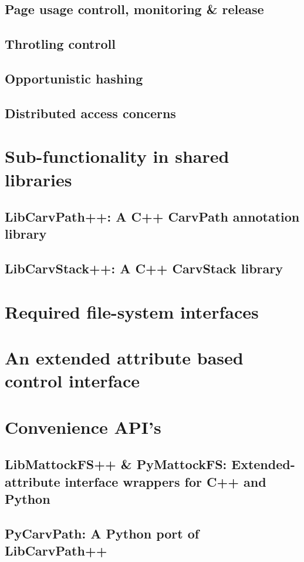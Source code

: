 \subsection{Page usage controll, monitoring \& release}
\subsection{Throtling controll}
\subsection{Opportunistic hashing}
\subsection{Distributed access concerns}
\section{Sub-functionality in shared libraries}
\subsection{LibCarvPath++: A C++ CarvPath annotation library}
\subsection{LibCarvStack++: A C++ CarvStack library}
\section{Required file-system interfaces}
\section{An extended attribute based control interface}
\section{Convenience API's}
\subsection{LibMattockFS++ \& PyMattockFS: Extended-attribute interface wrappers for C++ and Python}
\subsection{PyCarvPath: A Python port of LibCarvPath++}
